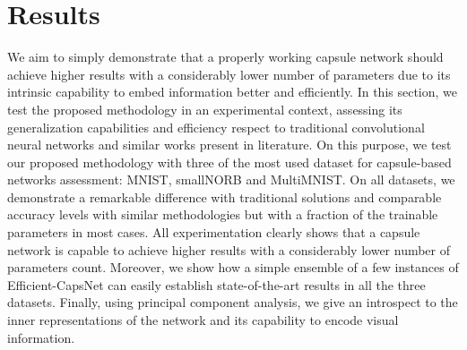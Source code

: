 \documentclass{article}
\begin{document}
\section{Results}
We aim to simply demonstrate that a properly working capsule network should achieve higher results with a considerably lower number of parameters due to its intrinsic capability to embed information better and efficiently. In this section, we test the proposed methodology in an experimental context, assessing its generalization capabilities and efficiency respect to traditional convolutional neural networks and similar works present in literature. 
On this purpose, we test our proposed methodology with three of the most used dataset for capsule-based networks assessment: MNIST, smallNORB and MultiMNIST. On all datasets, we demonstrate a remarkable difference with traditional solutions and comparable accuracy levels with similar methodologies but with a fraction of the trainable parameters in most cases. All experimentation clearly shows that a capsule network is capable to achieve higher results with a considerably lower number of parameters count. Moreover, we show how a simple ensemble of a few instances of Efficient-CapsNet can easily establish state-of-the-art results in all the three datasets. Finally, using principal component analysis, we give an introspect to the inner representations of the network and its capability to encode visual information.
\end{document}

